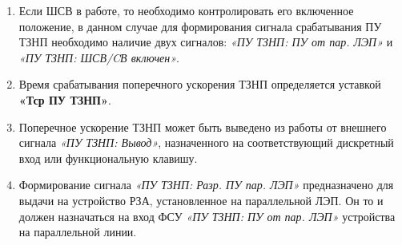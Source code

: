 \begin{enumerate}
\begin{enumerate}
\item
Если ШСВ в работе, то необходимо контролировать его включенное положение, в данном случае для формирования сигнала срабатывания ПУ ТЗНП необходимо наличие двух сигналов: \textit{«ПУ ТЗНП: ПУ от пар. ЛЭП»} и \textit{«ПУ ТЗНП: ШСВ/CВ включен»}.

\item
Время срабатывания поперечного ускорения ТЗНП определяется уставкой \textbf{«Тср ПУ ТЗНП»}.

\item
Поперечное ускорение ТЗНП может быть выведено из работы от внешнего сигнала \textit{«ПУ ТЗНП: Вывод»}, назначенного на соответствующий дискретный вход или функциональную клавишу.

\item
Формирование сигнала \textit{«ПУ ТЗНП: Разр. ПУ пар. ЛЭП»} предназначено для выдачи на устройство РЗА, установленное на параллельной ЛЭП. Он то и должен назначаться на вход ФСУ \textit{«ПУ ТЗНП: ПУ от пар. ЛЭП»} устройства на параллельной линии. 

\end{enumerate}

\end{enumerate}